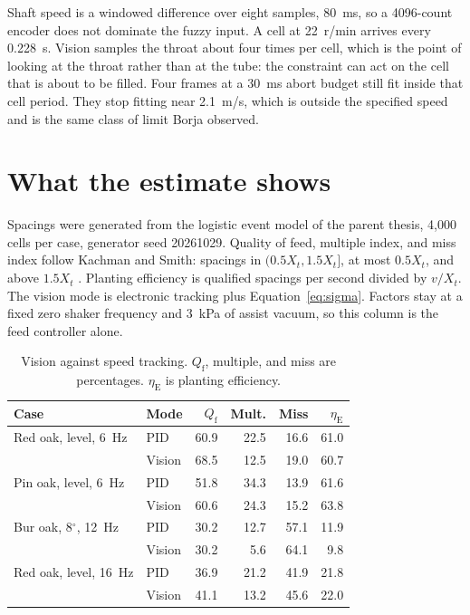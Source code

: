 \documentclass[11pt,a4paper]{article}
\begin{document}
Shaft speed is a windowed difference over eight samples, 80~ms, so a 4096-count encoder does not dominate the fuzzy input. A cell at 22~r/min arrives every 0.228~s. Vision samples the throat about four times per cell, which is the point of looking at the throat rather than at the tube: the constraint can act on the cell that is about to be filled. Four frames at a 30~ms abort budget still fit inside that cell period. They stop fitting near 2.1~m/s, which is outside the specified speed and is the same class of limit Borja observed.

\section{What the estimate shows}

Spacings were generated from the logistic event model of the parent thesis, 4{,}000 cells per case, generator seed 20261029. Quality of feed, multiple index, and miss index follow Kachman and Smith: spacings in $(0.5X_t,1.5X_t]$, at most $0.5X_t$, and above $1.5X_t$ \cite{kachman1995}. Planting efficiency is qualified spacings per second divided by $v/X_t$. The vision mode is electronic tracking plus Equation~\eqref{eq:sigma}. Factors stay at a fixed zero shaker frequency and 3~kPa of assist vacuum, so this column is the feed controller alone.

\begin{table}[ht]
\centering
\caption{Vision against speed tracking. $Q_{\mathrm{f}}$, multiple, and miss are percentages. $\eta_{\mathrm{E}}$ is planting efficiency.}
\label{tab:v}
\small
\begin{tabular}{@{}llrrrr@{}}
\toprule
Case & Mode & $Q_{\mathrm{f}}$ & Mult. & Miss & $\eta_{\mathrm{E}}$ \\
\midrule
Red oak, level, 6~Hz & PID & 60.9 & 22.5 & 16.6 & 61.0 \\
 & Vision & 68.5 & 12.5 & 19.0 & 60.7 \\
Pin oak, level, 6~Hz & PID & 51.8 & 34.3 & 13.9 & 61.6 \\
 & Vision & 60.6 & 24.3 & 15.2 & 63.8 \\
Bur oak, 8$^\circ$, 12~Hz & PID & 30.2 & 12.7 & 57.1 & 11.9 \\
 & Vision & 30.2 & 5.6 & 64.1 & 9.8 \\
Red oak, level, 16~Hz & PID & 36.9 & 21.2 & 41.9 & 21.8 \\
 & Vision & 41.1 & 13.2 & 45.6 & 22.0 \\
\bottomrule
\end{tabular}
\end{table}
\end{document}
